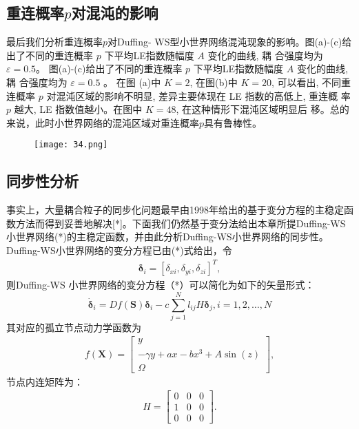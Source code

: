 \subsection*{重连概率$p$对混沌的影响}
最后我们分析重连概率$p$对Duffing- WS型小世界网络混沌现象的影响。图(a)-(c)给出了不同的重连概率
 $p$ 下平均LE指数随幅度 $A$ 变化的曲线, 耦 合强度均为 $\varepsilon=0.5$。
图(a)-(c)给出了不同的重连概率 $p$ 下平均LE指数随幅度 $A$ 变化的曲线, 耦 合强度均为 $\varepsilon=0.5$ 。
在图 (a)中 $K=2$, 在图(b)中 $K=20$, 可以看出, 不同重 连概率 $p$ 对混沌区域的影响不明显, 
差异主要体现在 LE 指数的高低上, 重连概 率 $p$ 越大, LE 指数值越小。在图中 $K=48$, 在这种情形下混沌区域明显后
移。总的来说，此时小世界网络的混沌区域对重连概率$p$具有鲁棒性。
\begin{figure}[!htbp]
    \centering
    \texttt{[image: 34.png]}
\end{figure}
\subsection{同步性分析}
事实上，大量耦合粒子的同步化问题最早由1998年给出的基于变分方程的主稳定函数方法而得到妥善地解决[*]。下面我们仍然基于变分法给出本章所提Duffing-WS小世界网络(*)的主稳定函数，并由此分析Duffing-WS小世界网络的同步性。
Duffing-WS小世界网络的变分方程已由(*)式给出，令
\begin{eqnarray*}
\boldsymbol{\delta}_{i}=\left[\delta_{xi}, \delta_{yi}, \delta_{zi}\right]^T,
\end{eqnarray*}
则Duffing-WS 小世界网络的变分方程（*）可以简化为如下的矢量形式：
\begin{equation}
    \dot{\boldsymbol{\delta}}_i=D f(\mathbf{S}) \boldsymbol{\delta}_i-c \sum_{j=1}^N l_{i j} H \boldsymbol{\delta}_j, i=1,2, \ldots, N
\end{equation}
其对应的孤立节点动力学函数为
\begin{eqnarray*}
 f(\mathbf{X})=\left[\begin{array}{c}y \\ -\gamma y+a x-b x^3+A \sin (z) \\ \Omega\end{array}\right],
\end{eqnarray*}
节点内连矩阵为：
\begin{eqnarray*}
H=\left[\begin{array}{lll}
0 & 0 & 0 \\
1 & 0 & 0 \\
0 & 0 & 0
\end{array}\right].
\end{eqnarray*}

